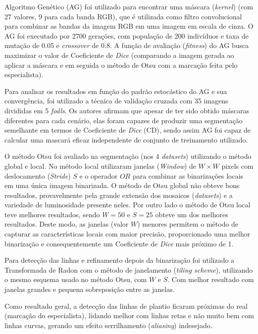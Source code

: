 \documentclass[12pt, a4paper, english, brazil]{article}
\begin{document}
Algoritmo Genético (AG) foi utilizado para encontrar uma máscara (\textit{kernel}) (com 27 valores, 9 para cada banda RGB), que é utilizada como filtro convolucional para combinar as bandas da imagem RGB em uma imagem em escala de cinza. O AG foi executado por 2700 gerações, com população de 200 indivíduos e taxa de mutação de 0.05 e \textit{crossover} de 0.8. A função de avaliação (\textit{fitness}) do AG busca maximizar o valor de Coeficiente de \textit{Dice} (comparando a imagem gerada ao aplicar a máscara e em seguida o método de Otsu com a marcação feita pelo especialista).

Para analisar os resultados em função do padrão estocástico do AG e sua convergência, foi utilizado a técnica de validação cruzada com 35 imagens divididas em 5 \textit{fodls}. Os autores afirmam que apesar de ter sido obtido máscaras diferentes para cada cenário, elas foram capazes de produzir uma segmentação semelhante em termos de Coeficiente de \textit{Dice} (CD), sendo assim AG foi capaz de calcular uma mascará eficaz independente de conjunto de treinamento utilizado.

O método Otsu foi avaliado na segmentação (nos 4 \textit{datasets}) utilizando o método global e local. No método local utilizaram janelas (\textit{Window}) de $W \times W$ pixels com deslocamento (\textit{Stride}) $S$ e o operador $OR$ para combinar as binarizações locais em uma única imagem binarizada. O método de Otsu global não obteve bons resultados, provavelmente pela grande extensão dos mosaicos (\textit{datasets}) e a variedade de luminosidade presente neles. Por outro lado o método de Otsu local teve melhores resultados, sendo $W=50$ e $S=25$ obteve um dos melhores resultados. Deste modo, as janelas (valor $W$) menores permitem o método de capturar as características locais com maior precisão, proporcionado uma melhor binarização e consequentemente um Coeficiente de \textit{Dice} mais próximo de 1.

Para detecção das linhas e refinamento depois da binarização foi utilizado a Transformada de Radon com o método de janelamento (\textit{tiling scheme}), utilizando o mesmo esquema usado no método Otsu, com $W$ e $S$. Com melhor resultado com janelas grandes e pequena sobreposição entre as janelas.

Como resultado geral, a detecção das linhas de plantio ficaram próximas do real (marcação do especialista), lidando melhor com linhas retas e não muito bem com linhas curvas, gerando um efeito serrilhamento (\textit{aliasing}) indesejado. 
\end{document}
